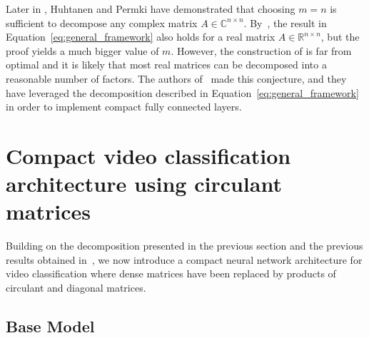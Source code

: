 \documentclass[runningheads]{llncs}
\begin{document}
Later in \cite{Huhtanen2015}, Huhtanen and Permki have demonstrated that choosing $m=n$ is sufficient to decompose  %
any complex matrix $A \in \mathbb C^{n\times n}$. %
By~\cite{schmid2000decomposing}, the result in Equation~\ref{eq:general_framework} also holds for a real matrix $A \in \mathbb R^{n\times n}$, but the proof yields a much bigger value of $m$. However,  the construction of \cite{schmid2000decomposing} is far from optimal and it is likely that most real matrices can be decomposed into a reasonable number of factors. The authors of~\cite{moczulski2015acdc} made this conjecture, and they have leveraged the decomposition described in Equation~\ref{eq:general_framework} in order to implement compact fully connected layers.


\section{Compact  video classification architecture using circulant matrices}
\label{section:archi}

Building on the decomposition presented in the previous section and the previous results obtained in~\cite{moczulski2015acdc}, we now introduce a compact neural network architecture for video classification where dense matrices have been replaced by products of circulant and diagonal matrices.


\subsection{Base Model}
\end{document}
